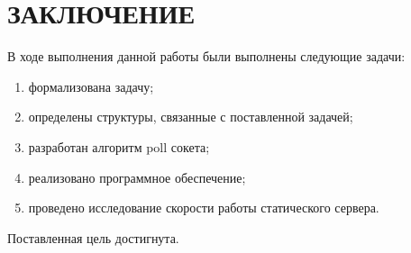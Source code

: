 \section*{\large ЗАКЛЮЧЕНИЕ}

В ходе выполнения данной работы были выполнены следующие задачи:
\begin{enumerate}
    \item формализована задачу;
    \item определены структуры, связанные с поставленной задачей;
    \item разработан алгоритм poll сокета;
    \item реализовано программное обеспечение;
    \item проведено исследование скорости работы статического сервера.
\end{enumerate}


Поставленная цель достигнута.